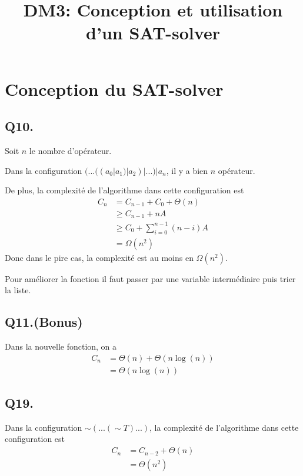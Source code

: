 

\title{DM3: Conception et utilisation d’un SAT-solver}
\author{}
\date{}


    \maketitle
    \section{Conception du SAT-solver}
    \subsection*{Q10.}
    Soit $n$ le nombre d'opérateur.
    
    Dans la configuration $(...((a_0 | a_1) | a_2) | ...) | a_n$,
    il y a bien $n$ opérateur.
    
    De plus, la complexité de l'algorithme dans cette configuration est
    \begin{align*}
        C_n &= C_{n-1} + C_0 + \Theta(n)\\
        &\geq C_{n-1} + nA\\
        &\geq C_0 + \sum_{i=0}^{n-1}(n-i)A\\
        &= \Omega(n^2)
    \end{align*}
    Donc dans le pire cas, la complexité est au moins en $\Omega(n^2)$.
    
    Pour améliorer la fonction
    il faut passer par une variable intermédiaire puis trier la liste.
    
    \subsection*{Q11.(Bonus)}
    Dans la nouvelle fonction, on a
    \begin{align*}
        C_n &= \Theta(n) + \Theta(n\log(n))\\
        &= \Theta(n\log(n))
    \end{align*}
    
    \subsection*{Q19.}
    Dans la configuration $\sim(...(\sim T)...)$, 
    la complexité de l'algorithme dans cette configuration est
    \begin{align*}
        C_n &= C_{n-2} + \Theta(n)\\
        &= \Theta(n^2)
    \end{align*}
    
